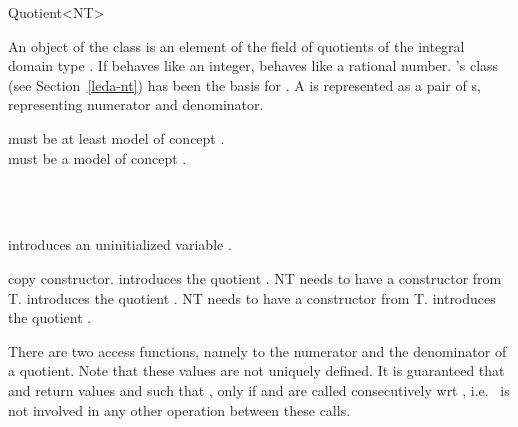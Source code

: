 
\begin{ccRefClass} {Quotient<NT>}
\label{Quotient}

\ccDefinition
An object of the class  is an element of the 
field of quotients of the integral domain type .
If  behaves like an integer, 
behaves like a rational number. 
{\leda}'s class  (see Section~\ref{leda-nt})
has been the basis for .
A   is represented as a pair of 
s, representing numerator and denominator.

 must be at least model of concept .\\
 must be a model of concept . \\



\ccIsModel

\\
\\

\ccCreation
{}

             {introduces an uninitialized variable \ccVar.}

\ccHidden {}
 	    {copy constructor.}
\ccGlue
{}
{introduces the quotient . NT needs to have a constructor from T.}
\ccGlue
{}
{introduces the quotient .
NT needs to have a constructor from T.}
\ccGlue
{}
            {introduces the quotient .}


\ccOperations


There are two access functions, namely to the
numerator and the denominator of a quotient.
Note that these values are not uniquely defined. 
It is guaranteed that  and 
 return values  and
 such that , only
if   and  are called
consecutively wrt , i.e.~ is not involved in 
any other operation between these calls.


\end{ccRefClass}
